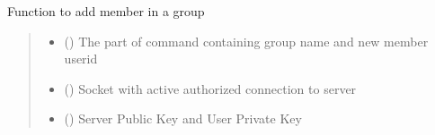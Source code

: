 \documentclass[letterpaper,10pt,english]{sphinxmanual}
\begin{document}
\begin{fulllineitems}
\label{\detokenize{userInputHandler:userInputHandler.addMemberInGroup}}
\pysigstartsignatures
{}
\pysigstopsignatures
\sphinxAtStartPar
Function to add member in a group
\begin{quote}\begin{description}
\begin{itemize}
\item {} 
\sphinxAtStartPar
{} () \textendash{} The part of command containing group name and new member userid

\item {} 
\sphinxAtStartPar
{} () \textendash{} Socket with active authorized connection to server

\item {} 
\sphinxAtStartPar
{} () \textendash{} Server Public Key and User Private Key

\end{itemize}

\end{description}\end{quote}

\end{fulllineitems}

\end{document}
